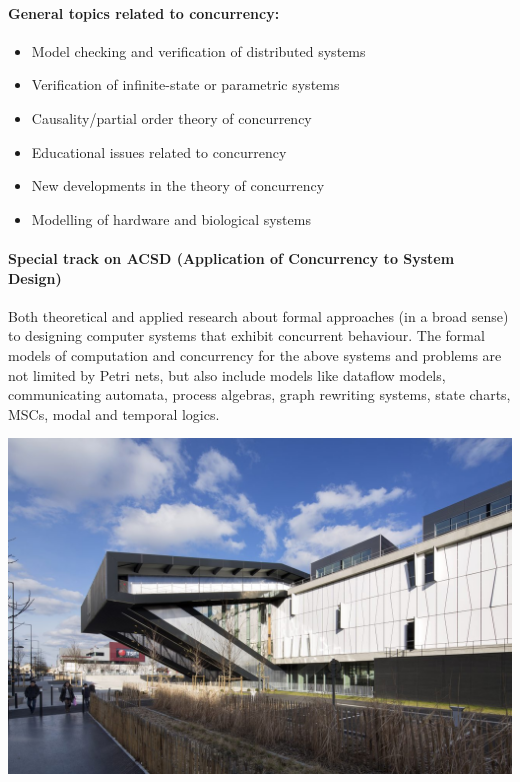 \documentclass[10pt,a4paper]{article}
\begin{document}
\begin{multicols}{2}
\paragraph*{General topics related to concurrency:}\mbox{}

\begin{itemize}
\item Model checking and verification of distributed systems
\item Verification of infinite-state or parametric systems
\item Causality/partial order theory of concurrency
\item Educational issues related to concurrency
\item New developments in the theory of concurrency
\item Modelling of hardware and biological systems
\end{itemize}

\vspace*{-0.5cm}
\paragraph*{Special track on ACSD (Application of Concurrency to System Design)}
Both theoretical and applied research about formal approaches (in a broad sense) to designing computer systems that exhibit concurrent behaviour.
The formal models of computation and concurrency for the above systems and problems are not limited by Petri nets, but also include models like dataflow models, communicating automata, process algebras, graph rewriting systems, state charts, MSCs, modal and temporal logics.


\begin{center}
\includegraphics[scale=0.19]{images/MSH.jpg}
\end{center}
\columnbreak


\end{multicols}
\end{document}
